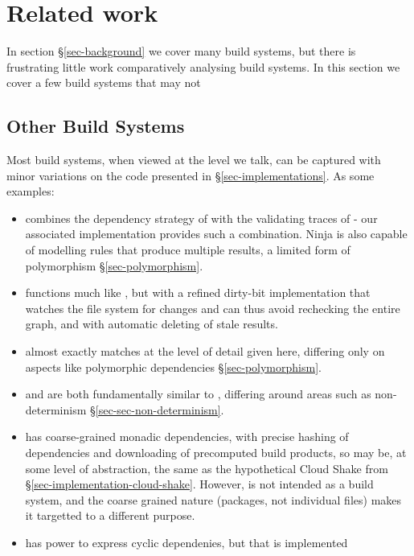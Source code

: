 \clearpage
\section{Related work}\label{sec-related}

In section \S\ref{sec-background} we cover many build systems, but there is frustrating little work comparatively analysing build systems. In this section we cover a few build systems that may not

\subsection{Other Build Systems}

Most build systems, when viewed at the level we talk, can be captured with minor variations on the code presented in \S\ref{sec-implementations}. As some examples:

\begin{itemize}
\item \Ninja \cite{ninja} combines the dependency strategy of \Make with the validating traces of \Shake - our associated implementation provides such a combination. Ninja is also capable of modelling rules that produce multiple results, a limited form of polymorphism \S\ref{sec-polymorphism}.
\item \Tup \cite{tup} functions much like \Make, but with a refined dirty-bit implementation that watches the file system for changes and can thus avoid rechecking the entire graph, and with automatic deleting of stale results.
\item \Redo \cite{redo} almost exactly matches \Shake at the level of detail given here, differing only on aspects like polymorphic dependencies \S\ref{sec-polymorphism}.
\item \Buck \cite{buck} and \CloudBuild \cite{cloudbuild} are both fundamentally similar to \Bazel, differing around areas such as non-determinism \S\ref{sec-sec-non-determinism}.
\item \Nix \cite{nix} has coarse-grained monadic dependencies, with precise hashing of dependencies and downloading of precomputed build products, so may be, at some level of abstraction, the same as the hypothetical Cloud Shake from \S\ref{sec-implementation-cloud-shake}. However, \Nix is not intended as a build system, and the coarse grained nature (packages, not individual files) makes it targetted to a different purpose. 
\item \Pluto \cite{pluto} has power to express cyclic dependenies, but that is implemented 
\end{itemize}

